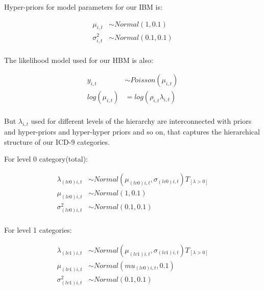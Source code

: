 Hyper-priors for model parameters for our IBM is:

\begin{equation} \label{ibmc8}
\begin{aligned}
\mu_{i,t} & \sim Normal(1,0.1)\\
\sigma^2_{i,t} &\sim Normal(0.1,0.1)\\
\end{aligned}
\end{equation}

The likelihood model used for our HBM is also:

\begin{equation} \label{hbma8}
\begin{aligned}
y_{i,t} & \sim Poisson(\mu_{i,t}) \\  
log(\mu_{i,t}) & = log(\rho_{i,t}\lambda_{i,t}) \\
\end{aligned}
\end{equation}

But $\lambda_{i,t}$ used for different levels of the hierarchy are interconnected with priors and hyper-priors and hyper-hyper priors and so on, that captures the hierarchical structure of our ICD-9 categories.

\newpara

For level 0 category(total):

\begin{equation} \label{hbm8b}
\begin{aligned}
\lambda_{(lv0)i,t} & \sim Normal(\mu_{(lv0)i,t},\sigma_{(lv0)i,t}) T_{[\lambda>0]}\\
\mu_{(lv0)i,t} & \sim Normal(1,0.1)\\
\sigma^2_{(lv0)i,t} &\sim Normal(0.1,0.1)\\
\end{aligned}
\end{equation}

For level 1 categories:

\begin{equation} \label{hbm8b}
\begin{aligned}
\lambda_{(lv1)i,t} & \sim Normal(\mu_{(lv1)i,t},\sigma_{(lv1)i,t}) T_{[\lambda>0]}\\
\mu_{(lv1)i,t} & \sim Normal(mu_{(lv0)i,t},0.1)\\
\sigma^2_{(lv1)i,t} &\sim Normal(0.1,0.1)\\
\end{aligned}
\end{equation}

